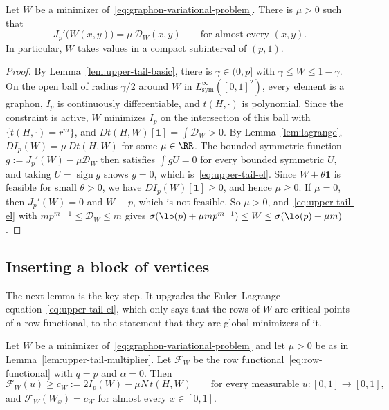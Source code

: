 \begin{lemma}\label{lem:upper-tail-multiplier}
Let $W$ be a minimizer of~\eqref{eq:graphon-variational-problem}.  There is
$\mu>0$ such that
\begin{equation}\label{eq:upper-tail-el}
  J_p'\bigl(W(x,y)\bigr)=\mu\,\mathcal D_W(x,y)\qquad\text{for almost every }(x,y).
\end{equation}
In particular, $W$ takes values in a compact subinterval of $(p,1)$.
\end{lemma}

\begin{proof}
By Lemma~\ref{lem:upper-tail-basic}, there is $\gamma\in(0,p]$ with
$\gamma\le W\le1-\gamma$.  On the open ball of radius $\gamma/2$ around $W$ in
$L^\infty_{\mathrm{sym}}([0,1]^2)$, every element is a graphon, $I_p$ is
continuously differentiable, and $t(H,\cdot)$ is polynomial.  Since the
constraint is active, $W$ minimizes $I_p$ on the intersection of this ball with
$\{t(H,\cdot)=r^m\}$, and $Dt(H,W)[\mathbf1]=\int\mathcal D_W>0$.  By
Lemma~\ref{lem:lagrange}, $DI_p(W)=\mu\,Dt(H,W)$ for some $\mu\in\RR$.  The
bounded symmetric function $g:=J_p'(W)-\mu\mathcal D_W$ then satisfies
$\int gU=0$ for every bounded symmetric $U$, and taking $U=\operatorname{sign}g$
shows $g=0$, which is~\eqref{eq:upper-tail-el}.  Since $W+\theta\mathbf 1$ is
feasible for small $\theta>0$, we have $DI_p(W)[\mathbf 1]\ge0$, and hence
$\mu\ge0$.  If $\mu=0$, then $J_p'(W)=0$ and $W\equiv p$, which is not feasible.
So $\mu>0$, and~\eqref{eq:upper-tail-el} with $mp^{m-1}\le\mathcal D_W\le m$
gives $\sigma(\lo(p)+\mu mp^{m-1})\le W\le\sigma(\lo(p)+\mu m)$.
\end{proof}

\subsection{Inserting a block of vertices}

The next lemma is the key step.  It upgrades the Euler--Lagrange
equation~\eqref{eq:upper-tail-el}, which only says that the rows of $W$ are
critical points of a row functional, to the statement that they are global
minimizers of it.

\begin{lemma}\label{lem:upper-tail-insertion}
Let $W$ be a minimizer of~\eqref{eq:graphon-variational-problem} and let
$\mu>0$ be as in Lemma~\ref{lem:upper-tail-multiplier}.  Let $\mathcal F_W$ be
the row functional~\eqref{eq:row-functional} with $q=p$ and $\alpha=0$.  Then
\[
  \mathcal F_W(u)\ge c_W:=2I_p(W)-\mu N\,t(H,W)
  \qquad\text{for every measurable }u:[0,1]\to[0,1],
\]
and $\mathcal F_W(W_x)=c_W$ for almost every $x\in[0,1]$.
\end{lemma}

